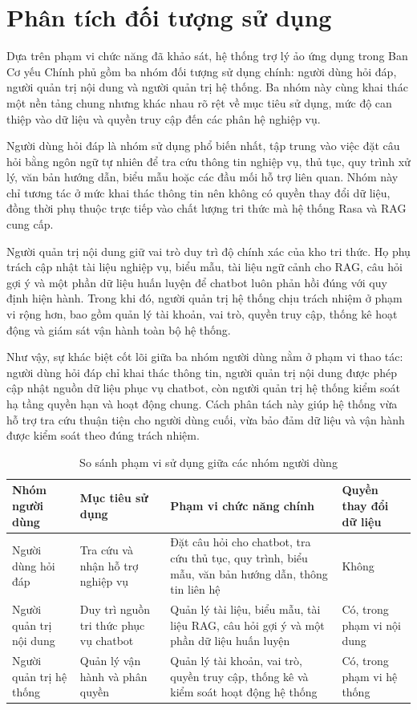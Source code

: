 \section{Phân tích đối tượng sử dụng}
Dựa trên phạm vi chức năng đã khảo sát, hệ thống trợ lý ảo ứng dụng trong Ban Cơ yếu Chính phủ gồm ba nhóm đối tượng sử dụng chính: người dùng hỏi đáp, người quản trị nội dung và người quản trị hệ thống. Ba nhóm này cùng khai thác một nền tảng chung nhưng khác nhau rõ rệt về mục tiêu sử dụng, mức độ can thiệp vào dữ liệu và quyền truy cập đến các phân hệ nghiệp vụ.

Người dùng hỏi đáp là nhóm sử dụng phổ biến nhất, tập trung vào việc đặt câu hỏi bằng ngôn ngữ tự nhiên để tra cứu thông tin nghiệp vụ, thủ tục, quy trình xử lý, văn bản hướng dẫn, biểu mẫu hoặc các đầu mối hỗ trợ liên quan. Nhóm này chỉ tương tác ở mức khai thác thông tin nên không có quyền thay đổi dữ liệu, đồng thời phụ thuộc trực tiếp vào chất lượng tri thức mà hệ thống Rasa và RAG cung cấp.

Người quản trị nội dung giữ vai trò duy trì độ chính xác của kho tri thức. Họ phụ trách cập nhật tài liệu nghiệp vụ, biểu mẫu, tài liệu ngữ cảnh cho RAG, câu hỏi gợi ý và một phần dữ liệu huấn luyện để chatbot luôn phản hồi đúng với quy định hiện hành. Trong khi đó, người quản trị hệ thống chịu trách nhiệm ở phạm vi rộng hơn, bao gồm quản lý tài khoản, vai trò, quyền truy cập, thống kê hoạt động và giám sát vận hành toàn bộ hệ thống.

Như vậy, sự khác biệt cốt lõi giữa ba nhóm người dùng nằm ở phạm vi thao tác: người dùng hỏi đáp chỉ khai thác thông tin, người quản trị nội dung được phép cập nhật nguồn dữ liệu phục vụ chatbot, còn người quản trị hệ thống kiểm soát hạ tầng quyền hạn và hoạt động chung. Cách phân tách này giúp hệ thống vừa hỗ trợ tra cứu thuận tiện cho người dùng cuối, vừa bảo đảm dữ liệu và vận hành được kiểm soát theo đúng trách nhiệm.

\begin{table}[H]
    \centering
    \caption{So sánh phạm vi sử dụng giữa các nhóm người dùng}
    \small
    \begin{tabularx}{\textwidth}{|p{3cm}|p{3cm}|X|p{2.5cm}|}
        \hline
        \textbf{Nhóm người dùng} & \textbf{Mục tiêu sử dụng} & \textbf{Phạm vi chức năng chính} & \textbf{Quyền thay đổi dữ liệu} \\ \hline
        Người dùng hỏi đáp & Tra cứu và nhận hỗ trợ nghiệp vụ & Đặt câu hỏi cho chatbot, tra cứu thủ tục, quy trình, biểu mẫu, văn bản hướng dẫn, thông tin liên hệ & Không \\ \hline
        Người quản trị nội dung & Duy trì nguồn tri thức phục vụ chatbot & Quản lý tài liệu, biểu mẫu, tài liệu RAG, câu hỏi gợi ý và một phần dữ liệu huấn luyện & Có, trong phạm vi nội dung \\ \hline
        Người quản trị hệ thống & Quản lý vận hành và phân quyền & Quản lý tài khoản, vai trò, quyền truy cập, thống kê và kiểm soát hoạt động hệ thống & Có, trong phạm vi hệ thống \\ \hline
    \end{tabularx}
\end{table}
